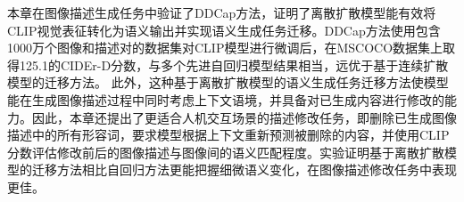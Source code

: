 
本章在图像描述生成任务\cite{karpathy2015deep, vinyals2015show}中验证了DDCap方法，证明了离散扩散模型能有效将CLIP视觉表征转化为语义输出并实现语义生成任务迁移。DDCap方法使用包含1000万个图像和描述对的数据集对CLIP模型进行微调后，在MSCOCO数据集\cite{chen2015microsoft}上取得125.1的CIDEr-D分数\cite{cider}，与多个先进自回归模型\cite{OSCAR,VinVL,UFO,ViTCap}结果相当，远优于基于连续扩散模型的迁移方法。
此外，这种基于离散扩散模型的语义生成任务迁移方法使模型能在生成图像描述过程中同时考虑上下文语境，并具备对已生成内容进行修改的能力。因此，本章还提出了更适合人机交互场景的描述修改任务，即删除已生成图像描述中的所有形容词，要求模型根据上下文重新预测被删除的内容，并使用CLIP分数\cite{CLIPScore}评估修改前后的图像描述与图像间的语义匹配程度。实验证明基于离散扩散模型的迁移方法相比自回归方法更能把握细微语义变化，在图像描述修改任务中表现更佳。


